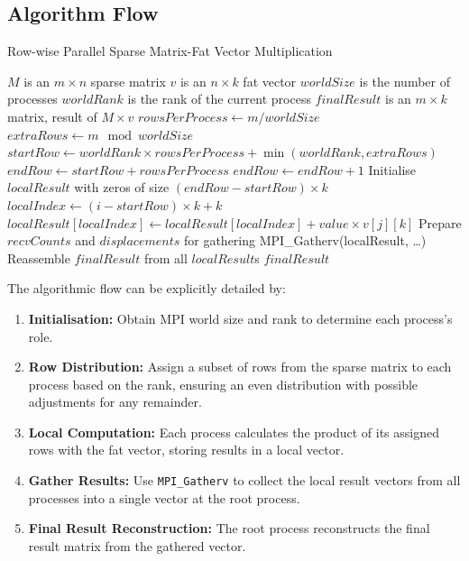 \documentclass[12pt,oneside]{book} %
\begin{document}
\subsection{Algorithm Flow}

\begin{algorithm}[H]
    \caption{Row-wise Parallel Sparse Matrix-Fat Vector Multiplication}
    \begin{algorithmic}
        \Require $M$ is an $m \times n$ sparse matrix
        \Require $v$ is an $n \times k$ fat vector
        \Require $worldSize$ is the number of processes
        \Require $worldRank$ is the rank of the current process
        \Ensure  $finalResult$ is an $m \times k$ matrix, result of $M \times v$
        \State $rowsPerProcess \gets m / worldSize$
        \State $extraRows \gets m \mod worldSize$
        \State $startRow \gets worldRank \times rowsPerProcess + \min(worldRank, extraRows)$
        \State $endRow \gets startRow + rowsPerProcess$
        \State $endRow \gets endRow + 1$
        \EndIf
        \State Initialise $localResult$ with zeros of size $(endRow - startRow) \times k$
        \State $localIndex \gets (i - startRow) \times k + k$
        \State $localResult[localIndex] \gets localResult[localIndex] + value \times v[j][k]$
        \EndFor
        \EndFor
        \EndFor
        \State Prepare $recvCounts$ and $displacements$ for gathering
        \EndIf
        \State MPI\_Gatherv(localResult, \ldots)
        \State Reassemble $finalResult$ from all $localResult$s
        \State \Return $finalResult$
        \EndIf
    \end{algorithmic}
\end{algorithm}

The algorithmic flow can be explicitly detailed by:
\begin{enumerate}
    \item \textbf{Initialisation:} Obtain MPI world size and rank to determine each process's role.
    \item \textbf{Row Distribution:} Assign a subset of rows from the sparse matrix to each process based on the rank, ensuring an even distribution with possible adjustments for any remainder.
    \item \textbf{Local Computation:} Each process calculates the product of its assigned rows with the fat vector, storing results in a local vector.
    \item \textbf{Gather Results:} Use \texttt{MPI\_Gatherv} to collect the local result vectors from all processes into a single vector at the root process.
    \item \textbf{Final Result Reconstruction:} The root process reconstructs the final result matrix from the gathered vector.
\end{enumerate}
\end{document}
